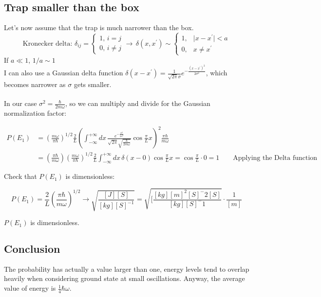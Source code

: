 	\subsection{Trap smaller than the box}
	Let's now assume that the trap is much narrower than the box.
	\[\text{Kronecker delta: }  \delta_{i j}=\begin{cases}1,\, i=j \\ 0,\, i \neq j \end{cases} \rightarrow\, \delta(x, x^{\prime}) \sim\begin{cases}1,& \mid x-x^{\prime} \mid<a \\ 0, & x \neq x^{\prime}\end{cases}
	\]
	If $a\ll1$, $1/a\sim 1$\\
	I can also use a Gaussian delta function  $\delta\left(x-x^{\prime}\right)=\frac{1}{\sqrt{2 \pi} \sigma} e^{-\frac{\left(x-x^{\prime}\right)^{2}}{2 \sigma^{2}}}$, which becomes narrower as $\sigma$ gets smaller.\\
	\\
	In our case $\sigma^2= \frac{\hbar}{2m\omega}$, so we can multiply and divide for the Gaussian normalization factor:

	\begin{align*}
		P\left(E_{1}\right)&=\left(\frac{m \omega}{ \pi \hbar}\right)^{1 / 2} \frac{2}{L}\left(\int_{-\infty}^{+\infty} d x\, \frac{e^{-\frac{x^{2}}{2\sigma^2}}}{\sqrt{2 \pi} \sqrt{\frac{\hbar}{2 m \omega}}} \cos \frac{\pi}{L} x\right)^2 \frac{ \pi \hbar}{m \omega}\\
											 &=\left(\frac{ \pi \hbar}{m\omega}\right) \left(\frac{m \omega}{ \pi \hbar}\right)^{1 / 2} \frac{2}{L}\int_{-\infty}^{+\infty} d x\, \delta(x-0) \cos \frac{\pi}{L} x=\cos \frac{\pi}{L} \cdot0=1\qquad\text{Applying the Delta function}
	\end{align*}

	\noindent
	Check that $P(E_1)$ is dimensionless:

	$$P\left(E_{1}\right)=\frac{2}{L}\left(\frac{ \pi \hbar}{m \omega}\right)^{1 / 2} \rightarrow \sqrt{\frac{[J][S]}{[k g][S]^{-1}}}=\sqrt{[\frac{[kg][m]^2[S]^-2[S]}{[kg][S]^-1}} \cdot \frac{1}{[m]}$$

	$P\left(E_{1}\right)$ is dimensionless.

	\subsection{Conclusion}
	The probability has actually a value larger than one, energy levels tend to overlap heavily when considering ground state at small oscillations.
	Anyway, the average value of energy is $\frac{1}{4}\hbar\omega$.
